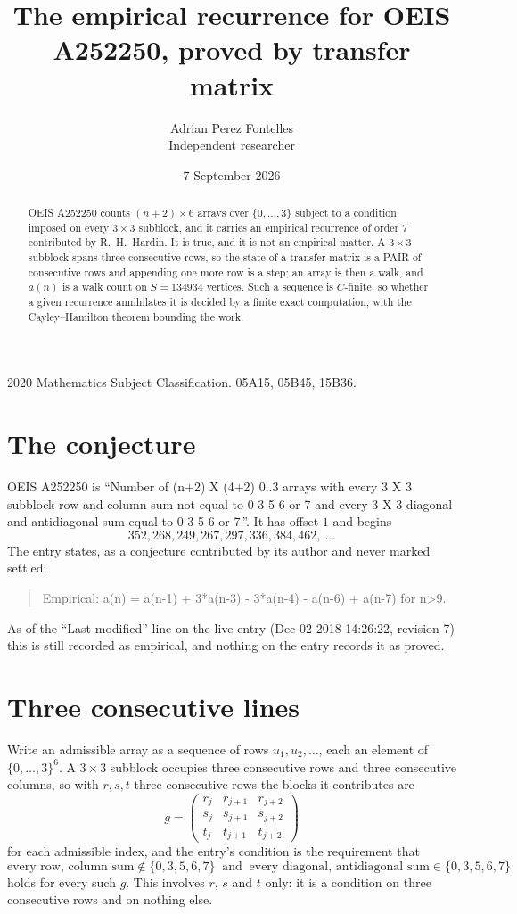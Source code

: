 \documentclass[11pt,a4paper]{article}
\title{The empirical recurrence for OEIS A252250, proved by transfer matrix}
\author{Adrian Perez Fontelles\\ \small Independent researcher}
\date{7 September 2026}
\theoremstyle{plain}
\theoremstyle{definition}
\begin{document}
\maketitle

\begin{abstract}
OEIS A252250 counts $(n+2)\times6$ arrays over $\{0,\dots,3\}$ subject to a condition imposed on
every $3\times3$ subblock, and it carries an empirical recurrence of order $7$
contributed by R.~H.~Hardin. It is true, and it is not an empirical matter. A $3\times3$
subblock spans three consecutive rows, so the state of a transfer matrix is a PAIR of
consecutive rows and appending one more row is a step; an array is then a walk, and
$a(n)$ is a walk count on $S=134934$ vertices. Such a sequence is $C$-finite, so whether a given
recurrence annihilates it is decided by a finite exact computation, with the Cayley--Hamilton
theorem bounding the work.
\end{abstract}

\noindent\small 2020 Mathematics Subject Classification. 05A15, 05B45, 15B36.\normalsize

\section{The conjecture}

OEIS A252250 is ``Number of (n+2) X (4+2) 0..3 arrays with every 3 X 3 subblock row and column sum not equal to 0 3 5 6 or 7 and every 3 X 3 diagonal and antidiagonal sum equal to 0 3 5 6 or 7.''. It has offset $1$ and begins
\[
352, 268, 249, 267, 297, 336, 384, 462,\ \dots
\]
The entry states, as a conjecture contributed by its author and never marked settled:
\begin{quote}
Empirical: a(n) = a(n-1) + 3*a(n-3) - 3*a(n-4) - a(n-6) + a(n-7) for n>9.
\end{quote}
As of the ``Last modified'' line on the live entry (Dec 02 2018 14:26:22, revision 7) this is still
recorded as empirical, and nothing on the entry records it as proved.

\section{Three consecutive lines}

Write an admissible array as a sequence of rows $u_1,u_2,\dots$, each an element of
$\{0,\dots,3\}^{6}$. A $3\times3$ subblock occupies three consecutive rows and
three consecutive columns, so with $r,s,t$ three consecutive rows the blocks it
contributes are
\[
g=\begin{pmatrix}r_j&r_{j+1}&r_{j+2}\\ s_j&s_{j+1}&s_{j+2}\\ t_j&t_{j+1}&t_{j+2}\end{pmatrix}
\]
for each admissible index, and the entry's condition is the requirement that
\[
\text{every row, column sum} \notin \{0,3,5,6,7\}\ \text{ and }\ \text{every diagonal, antidiagonal sum} \in \{0,3,5,6,7\}
\]
holds for every such $g$. This involves $r$, $s$ and $t$ only: it is a condition on
three consecutive rows and on nothing else.
\end{document}
